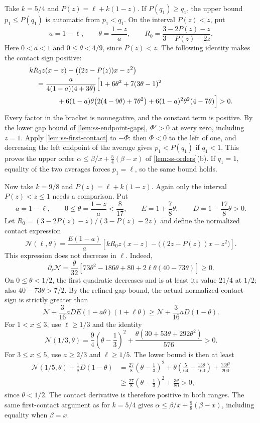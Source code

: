  Take $k=5/4$ and $P(z)=\ell+k(1-z)$. If $P(q_1)\ge q_1$, the
upper bound $p_1\le P(q_1)$ is automatic from $p_1<q_1$. On the interval $P(z)<z$, put
\[
 a=1-\ell,\qquad \theta=\frac{1-z}{a},\qquad
 R_0=\frac{3-2P(z)-z}{3-P(z)-2z}.
\]
Here $0<a<1$ and $0\le\theta<4/9$, since $P(z)<z$.
The following identity makes the contact sign positive:
\begin{align*}
 &kR_0z(x-z)-\bigl((2z-P(z))x-z^2\bigr)\\
 &\quad=\frac{a}{4(1-a)(4+3\theta)}\Bigl[
 1+6\theta^2+7(3\theta-1)^2\\
 &\qquad\qquad
 +6(1-a)\theta\bigl(2(4-9\theta)+7\theta^2\bigr)
 +6(1-a)^2\theta^2(4-7\theta)\Bigr]>0.
\end{align*}
Every factor in the bracket is nonnegative, and the constant term is positive.
By the lower gap bound of \cref{lem:ss-endpoint-gaps}, $\Phi'>0$ at every zero,
including $z=1$. Apply \cref{lem:ss-first-contact} to $-\Phi$: then $\Phi<0$ to the left of
one, and decreasing the left endpoint of the average gives $p_1<P(q_1)$ if $q_1<1$.
This proves the upper order $\alpha\le\beta/x+\frac54(\beta-x)$ of \cref{lem:ss-orders}(b).
If $q_1=1$, equality of the two averages forces $p_1=\ell$, so the same bound holds.

 Now take $k=9/8$ and $P(z)=\ell+k(1-z)$.
Again only the interval $P(z)<z\le1$ needs a comparison. Put
\[
 a=1-\ell,\qquad 0\le\theta=\frac{1-z}{a}<\frac8{17},\qquad
 E=1+\frac78\theta,\qquad D=1-\frac{17}{8}\theta>0.
\]
Let $R_0=(3-2P(z)-z)/(3-P(z)-2z)$ and define the normalized contact expression
\[
 \mathcal N(\ell,\theta)=\frac{E(1-a)}a
 \left[kR_0z(x-z)-\bigl((2z-P(z))x-z^2\bigr)\right].
\]
This expression does not decrease in $\ell$. Indeed,
\[
 \partial_\ell\mathcal N
 =\frac\theta{32}\left[73\theta^2-186\theta+80
                   +2\ell\theta(40-73\theta)\right]\ge0.
\]
On $0\le\theta<1/2$, the first quadratic decreases and is at least its value $21/4$ at
$1/2$; also $40-73\theta>7/2$.
By the refined gap bound, the actual normalized contact sign is strictly greater than
\[
 \mathcal N+\frac3{16}aDE(1-a\theta)(1+\ell\theta)
 \ge\mathcal N+\frac3{16}aD(1-\theta).
\]
For $1<x\le3$, use $\ell\ge1/3$ and the identity
\[
 \mathcal N(1/3,\theta)
 =\frac94\left(\theta-\frac13\right)^2
       +\frac{\theta(30+53\theta+292\theta^2)}{576}>0.
\]
For $3\le x\le5$, use $a\ge2/3$ and $\ell\ge1/5$. The lower bound is then at least
\begin{align*}
 \mathcal N(1/5,\theta)+\frac18D(1-\theta)
 &=\frac{27}{8}\left(\theta-\frac13\right)^2
    +\theta\left(\frac5{64}-\frac{13\theta}{160}\right)
    +\frac{73\theta^3}{200}\\
 &\ge\frac{27}{8}\left(\theta-\frac13\right)^2+\frac{3\theta}{80}>0,
\end{align*}
since $\theta<1/2$. The contact derivative is therefore positive in both ranges.
The same first-contact argument as for $k=5/4$ gives
$\alpha\le\beta/x+\frac98(\beta-x)$, including equality when $\beta=x$.

